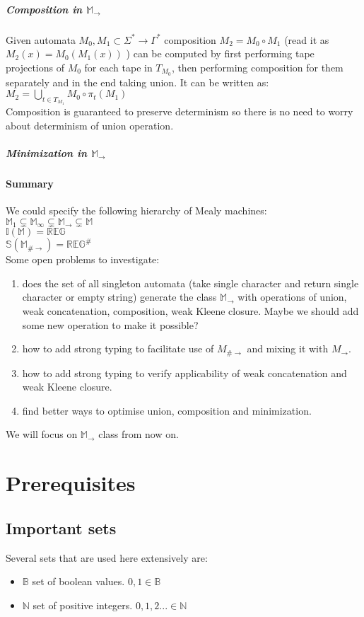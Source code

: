 \documentclass[12pt]{article}
\begin{document}
\subparagraph{Composition in $\mathbb{M}_\rightarrow$} Given automata $M_0,M_1 \subset \Sigma^* \rightarrow \Gamma^*$ composition $M_2=M_0 \circ M_1$ (read it as $M_2(x) = M_0(M_1(x))$ ) can be computed by first performing tape projections of $M_0$ for each tape in $T_{M_0}$, then performing composition for them separately and in the end taking union. It can be written as: \\
$M_2 = \bigcup_{t\in T_{M_1}} M_0 \circ \pi_t(M_1)$ \\
Composition is guaranteed to preserve determinism so there is no need to worry about determinism of union operation.


\subparagraph{Minimization in $\mathbb{M}_\rightarrow$} 



\paragraph{Summary} We could specify the following hierarchy of Mealy machines: \\
$\mathbb{M}_1 \subsetneq \mathbb{M}_\infty \subsetneq \mathbb{M}_\rightarrow \subsetneq \mathbb{M}$ \\
$\mathbb{I}(\mathbb{M}) = \mathbb{REG}$ \\
$\mathbb{S}(\mathbb{M}_{\#\rightarrow}) = \mathbb{REG}^\#$ \\
Some open problems to investigate: 
\begin{enumerate}
	\item does the set of all singleton automata  (take single character and return single character or empty string) generate the class $\mathbb{ M}_\rightarrow$ with operations of union, weak concatenation, composition, weak Kleene closure. Maybe  we should add some new operation to make it possible?
	\item how to add strong typing to facilitate use of $M_{\#\rightarrow}$ and mixing it with $M_{\rightarrow}$.
	\item how to add strong typing to verify applicability of weak concatenation and weak Kleene closure.
	\item find better ways to optimise union, composition and minimization.
\end{enumerate}
We will focus on $\mathbb{M}_\rightarrow$ class from now on.
\section{Prerequisites}
\subsection{Important sets}
Several sets that are used here extensively are:
\begin{itemize}
	\item $\mathbb{ B}$ set of boolean values. $0,1 \in\mathbb{ B}$ 
	\item $\mathbb{ N}$ set of positive integers. $0,1,2... \in\mathbb{ N}$ 
\end{itemize}
\end{document}
